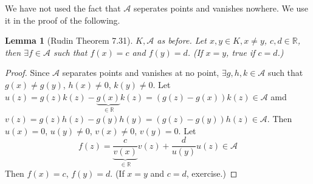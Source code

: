 \documentclass{article}
\theoremstyle{plain}
\newtheorem{lemma}{Lemma}
\theoremstyle{remark}
\newcommand{\R}{{\mathbb R}}
\begin{document}
We have not used the fact that $\mathcal{A}$ seperates points and vanishes nowhere.
We use it in the proof of the following.
\begin{lemma}[Rudin Theorem 7.31]
	$K,\mathcal{A}$ as before.
	Let $x,y \in K, x \neq y$, $c,d \in \R$,
	then $\exists f \in \mathcal{A}$ such that $f(x) = c$ and $f(y) = d$.
	(If $x = y$, true if $c = d$.)
\end{lemma}
\begin{proof}
	Since $\mathcal{A}$ separates points and vanishes at no point,
	$\exists g,h,k \in \mathcal{A}$ such that
	$g(x) \neq g(y)$, $h(x) \neq 0$, $k(y) \neq 0$.
	Let $u(z) = g(z)k(z) - \underbrace{g(x)}_{\in\R}k(z) = (g(z) - g(x))k(z) \in \mathcal{A}$
	amd $v(z) = g(z)h(z) - g(y)h(y) = (g(z) - g(y))h(z) \in \mathcal{A}$.
	Then $u(x) = 0$, $u(y) \neq 0$, $v(x) \neq 0$, $v(y) = 0$. Let
	\[
		f(z) = \underbrace{\frac{c}{v(x)}}_{\in\R}v(z) + \frac{d}{u(y)}u(z) \in \mathcal{A}
	\]
	Then $f(x) = c$, $f(y) = d$.
	(If $x = y$ and $c = d$, exercise.)
\end{proof}
\end{document}
